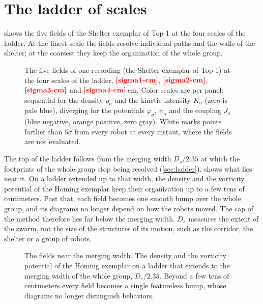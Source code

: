\section{The ladder of scales}
\label{app:gallery}

 shows the five fields of the Shelter exemplar of Top-1 at the four scales of
the ladder. At the finest scale the fields resolve individual paths and the walls of the shelter; at
the coarsest they keep the organization of the whole group.

\begin{figure}[!htbp]
\centering
{}
\caption{The five fields of one recording (the Shelter exemplar of Top-1) at the four scales of the
ladder, $\nm{sigma1-cm}$, $\nm{sigma2-cm}$, $\nm{sigma3-cm}$ and $\nm{sigma4-cm}$\,cm.
Color scales are per panel: sequential for the density $\rho_\sigma$ and the kinetic intensity
$K_\sigma$ (zero is pale blue), diverging for the potentials $\varphi_\sigma$, $\psi_\sigma$ and the
coupling $J_\sigma$ (blue negative, orange positive, zero gray). White marks points farther than
$5\sigma$ from every robot at every instant, where the fields are not evaluated.}
\label{fig:scales_all}
\end{figure}
\FloatBarrier

The top of the ladder follows from the merging width $D_s/2.35$ at which the footprints of the whole
group stop being resolved (\cref{sec:ladder}).  shows what lies near it. On a ladder
extended up to that width, the density and the vorticity potential of the Homing exemplar keep their
organization up to a few tens of centimeters. Past that, each field becomes one smooth bump over the
whole group, and its diagrams no longer depend on how the robots moved. The cap of the method therefore lies far
below the merging width. $D_s$ measures the extent of the swarm, not the size of the structures of its
motion, such as the corridor, the shelter or a group of robots.

\begin{figure}[!htbp]
\centering
{}
\caption{The fields near the merging width. The density and the vorticity potential of the Homing
exemplar on a ladder that extends to the merging width of the whole group, $D_s/2.35$. Beyond a few
tens of centimeters every field becomes a single featureless bump, whose diagrams no longer
distinguish behaviors.}
\label{fig:uncapped}
\end{figure}
\FloatBarrier

